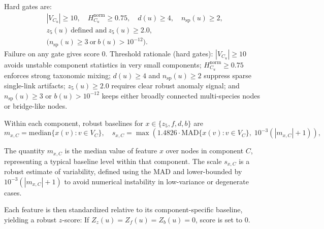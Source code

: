 \documentclass{article}
\begin{document}
Hard gates are:
\begin{equation}
\begin{aligned}
&|V_{C_u}|\ge 10,\quad H_{C_u}^{\mathrm{norm}}\ge 0.75,\quad d(u)\ge 4,\quad n_{\mathrm{sp}}(u)\ge 2,\\
&z_5(u)\ \text{defined and}\ z_5(u)\ge 2.0,\\
&\big(n_{\mathrm{sp}}(u)\ge 3\ \text{or}\ b(u)>10^{-12}\big).
\end{aligned}
\end{equation}
Failure on any gate gives score $0$.
Threshold rationale (hard gates): $|V_{C_u}|\ge 10$ avoids unstable component statistics in very small components; $H_{C_u}^{\mathrm{norm}}\ge 0.75$ enforces strong taxonomic mixing; $d(u)\ge 4$ and $n_{\mathrm{sp}}(u)\ge 2$ suppress sparse single-link artifacts; $z_5(u)\ge 2.0$ requires clear robust anomaly signal; and $n_{\mathrm{sp}}(u)\ge 3$ or $b(u)>10^{-12}$ keeps either broadly connected multi-species nodes or bridge-like nodes.
\vspace{0.5em}

Within each component, robust baselines for $x\in\{z_5,f,d,b\}$ are
\begin{equation}
m_{x,C}=\mathrm{median}\{x(v):v\in V_C\},\quad
s_{x,C}=\max\!\left(1.4826\cdot \mathrm{MAD}\{x(v):v\in V_C\},\;10^{-3}(|m_{x,C}|+1)\right),
\end{equation}

The quantity $m_{x,C}$ is the median value of feature $x$ over nodes in component $C$, representing a typical baseline level within that component. 
The scale $s_{x,C}$ is a robust estimate of variability, defined using the MAD and lower-bounded by $10^{-3}(|m_{x,C}|+1)$ to avoid numerical instability in low-variance or degenerate cases.

Each feature is then standardized relative to its component-specific baseline, yielding a robust $z$-score:
If $Z_z(u)=Z_f(u)=Z_b(u)=0$, score is set to $0$.
\vspace{0.5em}
\end{document}
